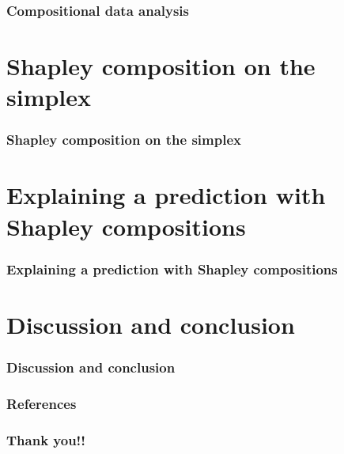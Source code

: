 \documentclass{beamer}
\begin{document}
\begin{frame}
\frametitle{Compositional data analysis}

\end{frame}

\section{Shapley composition on the simplex}

\begin{frame}
\frametitle{Shapley composition on the simplex}

\end{frame}

\section{Explaining a prediction with Shapley compositions}

\begin{frame}
\frametitle{Explaining a prediction with Shapley compositions}

\end{frame}

\section{Discussion and conclusion}

\begin{frame}
\frametitle{Discussion and conclusion}

\end{frame}


\begin{frame}[t,allowframebreaks]
   \frametitle{References}
    \printbibliography
  \end{frame}


\begin{frame}
\frametitle{Thank you!!}


\end{frame}
\end{document}
